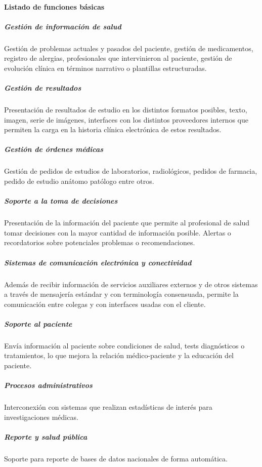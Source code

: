 \paragraph{Listado de funciones básicas}

\subparagraph{Gestión de información de salud}

Gestión de problemas actuales y pasados del paciente, gestión de medicamentos, registro de alergias, profesionales que intervinieron al paciente, gestión de evolución clínica en términos narrativo o plantillas estructuradas.

\subparagraph{Gestión de resultados}

Presentación de resultados de estudio en los distintos formatos posibles, texto, imagen, serie de imágenes, interfaces con los distintos proveedores internos que permiten la carga en la historia clínica electrónica de estos resultados.

\subparagraph{Gestión de órdenes médicas}

Gestión de pedidos de estudios de laboratorios, radiológicos, pedidos de farmacia, pedido de estudio anátomo patólogo entre otros. 

\subparagraph{Soporte a la toma de decisiones}

Presentación de la información del paciente que permite al profesional de salud tomar decisiones con la mayor cantidad de información posible. Alertas o recordatorios sobre potenciales problemas o recomendaciones.

\subparagraph{Sistemas de comunicación electrónica y conectividad}

Además de recibir información de servicios auxiliares externos y de otros sistemas a través de mensajería estándar y con terminología consensuada, permite la comunicación entre colegas y con interfaces usadas con el cliente.

\subparagraph{Soporte al paciente}

Envía información al paciente sobre condiciones de salud, tests diagnósticos o tratamientos, lo que mejora la relación médico-paciente y la educación del paciente.

\subparagraph{Procesos administrativos}

Interconexión con sistemas que realizan estadísticas de interés para investigaciones médicas.

\subparagraph{Reporte y salud pública}

Soporte para reporte de bases de datos nacionales de forma automática.

